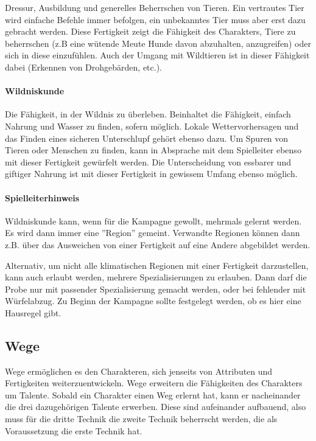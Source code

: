 \documentclass{article}
\begin{document}
Dressur, Ausbildung und generelles Beherrschen von Tieren. Ein vertrautes Tier wird einfache Befehle immer befolgen,
ein unbekanntes Tier muss aber erst dazu gebracht werden. Diese Fertigkeit zeigt die Fähigkeit des Charakters, Tiere
zu beherrschen (z.B eine wütende Meute Hunde davon abzuhalten, anzugreifen) oder sich in diese einzufühlen. Auch der Umgang mit
Wildtieren ist in dieser Fähigkeit dabei (Erkennen von Drohgebärden, etc.).

\paragraph{Wildniskunde}

Die Fähigkeit, in der Wildnis zu überleben. Beinhaltet die Fähigkeit, einfach Nahrung und Wasser zu finden, sofern
möglich. Lokale Wettervorhersagen und das Finden eines sicheren Unterschlupf gehört ebenso dazu. Um Spuren von
Tieren oder Menschen zu finden, kann in Absprache mit dem Spielleiter ebenso mit dieser Fertigkeit gewürfelt werden.
Die Unterscheidung von essbarer und giftiger Nahrung ist mit dieser Fertigkeit in gewissem Umfang ebenso möglich.

\begin{mdframed}[hidealllines=true, backgroundcolor=black!10]
\paragraph{Spielleiterhinweis}

Wildniskunde kann, wenn für die Kampagne gewollt, mehrmals gelernt werden. Es wird dann immer eine ''Region'' gemeint.
Verwandte Regionen können dann z.B. über das Ausweichen von einer Fertigkeit auf eine Andere abgebildet werden.

Alternativ, um nicht alle klimatischen Regionen mit einer Fertigkeit darzustellen, kann auch erlaubt werden, mehrere
Spezialisierungen zu erlauben. Dann darf die Probe nur mit passender Spezialisierung gemacht werden, oder bei
fehlender mit Würfelabzug. Zu Beginn der Kampagne sollte festgelegt werden, ob es hier eine Hausregel gibt.

\end{mdframed}
\begin{center}
\section{Wege}
\end{center}

Wege ermöglichen es den Charakteren, sich jenseits von Attributen und Fertigkeiten weiterzuentwickeln. Wege erweitern
die Fähigkeiten des Charakters um Talente. 
Sobald ein Charakter einen Weg erlernt hat, kann er nacheinander die drei dazugehörigen Talente erwerben. Diese sind
aufeinander aufbauend, also muss für die dritte Technik die zweite Technik beherrscht werden, die als Voraussetzung
die erste Technik hat.
\end{document}
